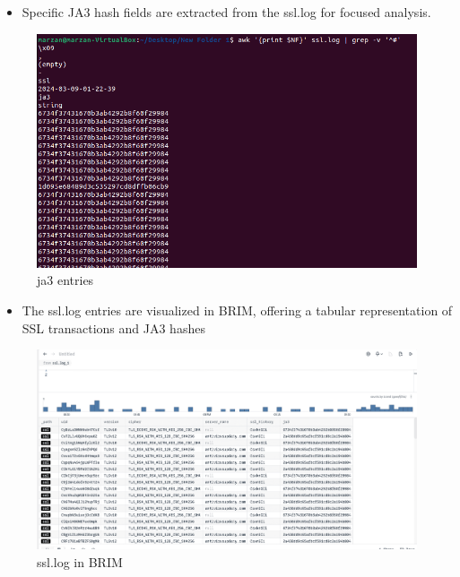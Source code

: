 \begin{itemize}
    \item Specific JA3 hash fields are extracted from the ssl.log for focused analysis.
\end{itemize}
\begin{figure}[H]
    \centering
    \includegraphics[width=1\linewidth]{images//ja3image/25.PNG}
    \caption{ja3 entries}
    \label{fig:enter-label}
\end{figure}

\begin{itemize}
    \item The ssl.log entries are visualized in BRIM, offering a tabular representation of SSL transactions and JA3 hashes
\end{itemize}
\begin{figure}[H]
    \centering
    \includegraphics[width=1\linewidth]{images//ja3image/31.PNG}
    \caption{ssl.log in BRIM}
    \label{fig:enter-label}
\end{figure}

